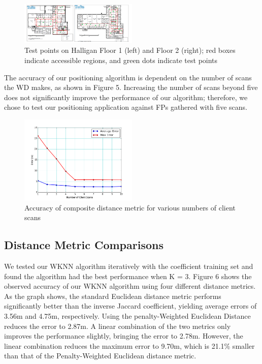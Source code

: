 \documentclass[conference]{IEEEtran}
\begin{document}
\begin{figure}[h!]
  \centering
    \includegraphics[width=0.5\textwidth]{testpoints}
   \caption{Test points on Halligan Floor 1 (left) and Floor 2 (right); red boxes indicate accessible regions, and green dots indicate test points}
\end{figure}

The accuracy of our positioning algorithm is dependent on the number of scans the WD makes, as shown in Figure 5. Increasing the number of scans beyond five does not significantly improve the performance of our algorithm; therefore, we chose to test our positioning application against FPs gathered with five scans.

\begin{figure}[h!]
  \centering
    \includegraphics[width=0.5\textwidth]{pull_errors.png}
   \caption{Accuracy of composite distance metric for various numbers of client scans}
\end{figure}

\subsection{Distance Metric Comparisons}
We tested our WKNN algorithm iteratively with the coefficient training set and found the algorithm had the best performance when K = 3. Figure 6 shows the observed accuracy of our WKNN algorithm using four different distance metrics. As the graph shows, the standard Euclidean distance metric performs significantly better than the inverse Jaccard coefficient, yielding average errors of 3.56m and 4.75m, respectively. Using the penalty-Weighted Euclidean Distance reduces the error to 2.87m. A linear combination of the two metrics only improves the performance slightly, bringing the error to 2.78m. However, the linear combination reduces the maximum error to 9.70m, which is 21.1\% smaller than that of the Penalty-Weighted Euclidean distance metric.
\end{document}

